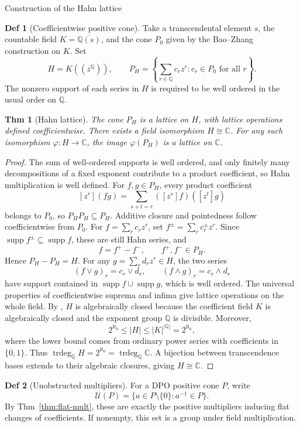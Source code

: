 \documentclass[10pt,letterpaper]{amsart}
\makeatletter
\numberwithin{equation}{section}
\newtheorem{thm}{Thm}[section]
\theoremstyle{definition}
\newtheorem{defn}{Def}[section]
\newcommand{\Q}{\mathbb Q}
\newcommand{\C}{\mathbb C}
\newcommand{\supp}{\operatorname{supp}}
\def\subsection{\@startsection{subsection}{2}
  \z@{.9\linespacing\@plus.3\linespacing}{.4\linespacing}
  {\normalfont\fontsize{11.5}{14}\selectfont\bfseries\boldmath\raggedright}}
\makeatother
\begin{document}
\subsection{Construction of the Hahn lattice}
\begin{defn}[Coefficientwise positive cone]\label{def:hahn}
Take a transcendental element $s$, the countable field $K=\overline{\Q(s)}$, and the cone $P_0$ given by the Bao--Zhang construction on $K$. Set
\[
H=K((z^{\Q})),\qquad
P_H=\left\{\sum_{r\in\Q}c_rz^r:c_r\in P_0\text{ for all }r\right\}.
\]
The nonzero support of each series in $H$ is required to be well ordered in the usual order on $\Q$.
\end{defn}

\begin{thm}[Hahn lattice]\label{thm:hahn}
The cone $P_H$ is a lattice on $H$, with lattice operations defined coefficientwise. There exists a field isomorphism $H\cong\C$. For any such isomorphism $\varphi:H\to\C$, the image $\varphi(P_H)$ is a lattice on $\C$.
\end{thm}
\begin{proof}
The sum of well-ordered supports is well ordered, and only finitely many decompositions of a fixed exponent contribute to a product coefficient, so Hahn multiplication is well defined. For $f,g\in P_H$, every product coefficient
\[
[z^r](fg)=\sum_{s+t=r}([z^s]f)([z^t]g)
\]
belongs to $P_0$, so $P_HP_H\subseteq P_H$. Additive closure and pointedness follow coefficientwise from $P_0$.
For $f=\sum_rc_rz^r$, set $f^\pm=\sum_rc_r^\pm z^r$. Since $\supp f^\pm\subseteq\supp f$, these are still Hahn series, and
\[
f=f^+-f^-,\qquad f^+,f^-\in P_H.
\]
Hence $P_H-P_H=H$. For any $g=\sum_rd_rz^r\in H$, the two series
\[
(f\vee g)_r=c_r\vee d_r,\qquad(f\wedge g)_r=c_r\wedge d_r
\]
have support contained in $\supp f\cup\supp g$, which is well ordered. The universal properties of coefficientwise suprema and infima give lattice operations on the whole field.
By \cite[Theorem 1]{MacLane}, $H$ is algebraically closed because the coefficient field $K$ is algebraically closed and the exponent group $\Q$ is divisible. Moreover,
\[
2^{\aleph_0}\le |H|\le |K|^{|\Q|}=2^{\aleph_0},
\]
where the lower bound comes from ordinary power series with coefficients in $\{0,1\}$. Thus $\operatorname{trdeg}_{\Q}H=2^{\aleph_0}=\operatorname{trdeg}_{\Q}\C$. A bijection between transcendence bases extends to their algebraic closures, giving $H\cong\C$.
\end{proof}

\begin{defn}[Unobstructed multipliers]\label{def:units}
For a DPO positive cone $P$, write
\[
\mathcal U(P)=\{a\in P\setminus\{0\}:a^{-1}\in P\}.
\]
By Thm~\ref{thm:flat-mult}, these are exactly the positive multipliers inducing flat changes of coefficients. If nonempty, this set is a group under field multiplication.
\end{defn}
\end{document}
